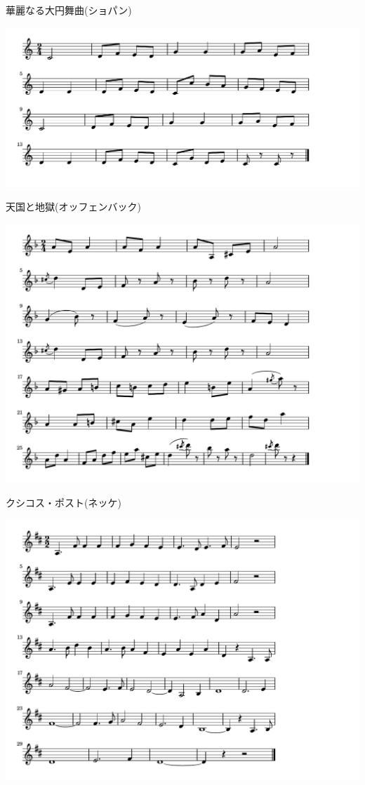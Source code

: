 \documentclass[a4paper]{ltjsarticle}
\begin{document}
\vspace{-10mm} \hspace{10mm}
華麗なる大円舞曲(ショパン)

\includegraphics[clip]{tengokujigoku_crop.pdf}

\vspace{-10mm} \hspace{10mm}
天国と地獄(オッフェンバック)

\includegraphics[clip]{csikospost_crop.pdf}

\vspace{-10mm} \hspace{10mm}
クシコス・ポスト(ネッケ)

\includegraphics[clip]{gunkan_crop.pdf}
\end{document}

